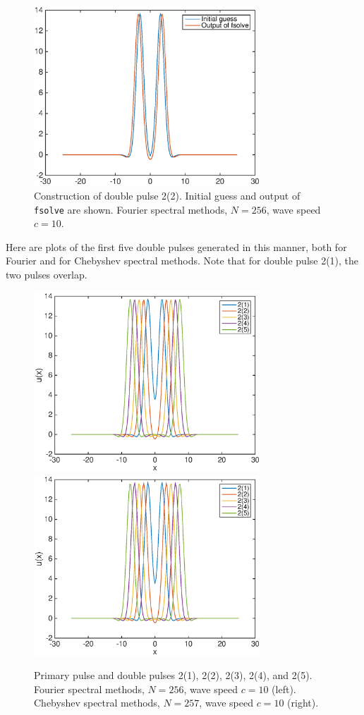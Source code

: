 \documentclass[12pt]{article}
\begin{document}
\begin{figure}[H]
	\includegraphics[width=8.5cm]{doublepulseconstruction}
	\caption{Construction of double pulse 2(2). Initial guess and output of \texttt{fsolve} are shown. Fourier spectral methods, $N = 256$, wave speed $c = 10$.}
\end{figure}

Here are plots of the first five double pulses generated in this manner, both for Fourier and for Chebyshev spectral methods. Note that for double pulse 2(1), the two pulses overlap.

\begin{figure}[H]
	\includegraphics[width=8.5cm]{four10double.eps}
	\includegraphics[width=8.5cm]{cheb10double}
	\caption{Primary pulse and double pulses 2(1), 2(2), 2(3), 2(4), and 2(5). Fourier spectral methods, $N = 256$, wave speed $c = 10$ (left). Chebyshev spectral methods, $N = 257$, wave speed $c = 10$ (right). }
\end{figure}
\end{document}
